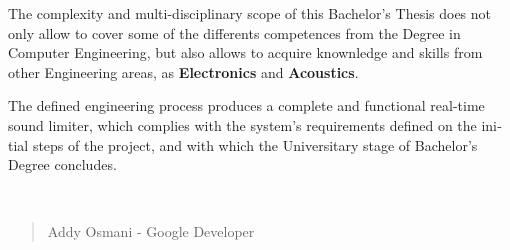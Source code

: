 \begin{otherlanguage}{english}
\begin{singlespace}
    \noindent The complexity and multi-disciplinary scope of this Bachelor's Thesis does not only allow to cover some of the differents competences from the Degree in Computer Engineering, but also allows to acquire knownledge and skills from other Engineering areas, as \textbf{Electronics} and \textbf{Acoustics}.

    \noindent The defined engineering process produces a complete and functional real-time sound limiter, which complies with the system's requirements defined on the initial steps of the project, and with which the Universitary stage of Bachelor's Degree concludes.

\end{singlespace}

\newpage
\thispagestyle{empty}

\end{otherlanguage}

~

\clearpage
{}
\thispagestyle{empty}

\vspace*{8cm}

\begin{quotation}
\noindent \begin{flushright}
\textbf{
	\textit{
	}
}
\vspace{0.5cm}
\large{Addy Osmani - Google Developer}

\par\end{flushright}{\large \par}
\end{quotation}
\newpage
\thispagestyle{empty}
